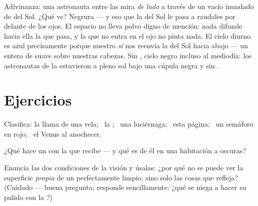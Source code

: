 \begin{remark}\label{rem:g7:light-sources-propagation:space}
Adivinanza: una astronauta entre las  mira \emph{de lado} a
través de un vacío inundado de  del Sol. ¿Qué ve? Negrura --- y eso
que la  del Sol le pasa a raudales por delante de los ojos. El
espacio no lleva polvo digno de mención: nada difunde hacia ella la
 que pasa, y la  que no entra en el ojo no pinta nada.
El cielo diurno es azul precisamente porque nuestro  \emph{sí}
nos reenvía la  del Sol hacia abajo --- un  entero de
 suave sobre nuestras cabezas. Sin , cielo negro
incluso al mediodía: los astronautas de la  estuvieron a pleno
sol bajo una cúpula negra y sin .
\end{remark}

\section{Ejercicios}

\begin{exercise}[$\star$]\label{exo:g7:light-sources-propagation:1}
Clasifica: la llama de una vela; \ la ; \ una luciérnaga; \
esta página; \ un semáforo en rojo; \ el  Venus al
anochecer.
\end{exercise}

\begin{exercise}[$\star$]\label{exo:g7:light-sources-propagation:2}
¿Qué hace un  con la  que recibe --- y qué es
de él en una habitación a oscuras?
\end{exercise}

\begin{exercise}[$\star$]\label{exo:g7:light-sources-propagation:3}
Enuncia las dos condiciones de la visión y úsalas: ¿por qué no se
puede ver la superficie \emph{propia} de un  perfectamente
limpio, sino solo las cosas que refleja? (Cuidado --- buena pregunta;
responde sencillamente: ¿qué se niega a hacer su pulido con la
?)
\end{exercise}

